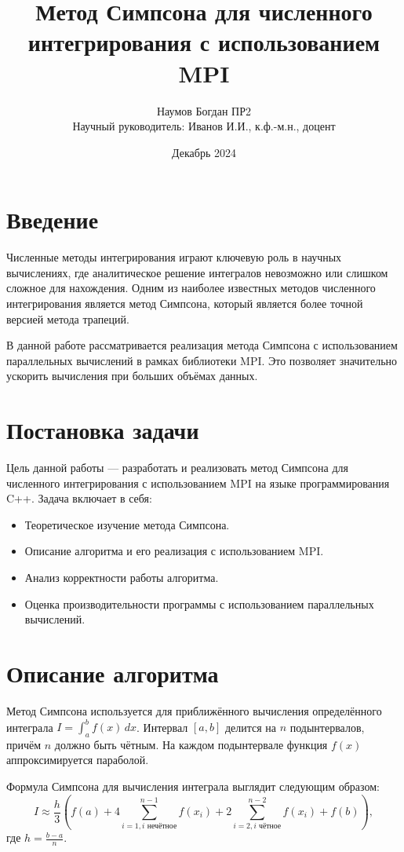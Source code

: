 \documentclass[a4paper,12pt]{article}
\title{Метод Симпсона для численного интегрирования с использованием MPI}
\author{Наумов Богдан ПР2\\Научный руководитель: Иванов И.И., к.ф.-м.н., доцент}
\date{Декабрь 2024}
\begin{document}
\maketitle

\section{Введение}
Численные методы интегрирования играют ключевую роль в научных вычислениях, где аналитическое решение интегралов невозможно или слишком сложное для нахождения. Одним из наиболее известных методов численного интегрирования является метод Симпсона, который является более точной версией метода трапеций.

В данной работе рассматривается реализация метода Симпсона с использованием параллельных вычислений в рамках библиотеки MPI. Это позволяет значительно ускорить вычисления при больших объёмах данных.

\section{Постановка задачи}
Цель данной работы — разработать и реализовать метод Симпсона для численного интегрирования с использованием MPI на языке программирования C++. Задача включает в себя:
\begin{itemize}
    \item Теоретическое изучение метода Симпсона.
    \item Описание алгоритма и его реализация с использованием MPI.
    \item Анализ корректности работы алгоритма.
    \item Оценка производительности программы с использованием параллельных вычислений.
\end{itemize}

\section{Описание алгоритма}
Метод Симпсона используется для приближённого вычисления определённого интеграла \( I = \int_a^b f(x) \, dx \). Интервал \([a, b]\) делится на \(n\) подынтервалов, причём \(n\) должно быть чётным. На каждом подынтервале функция \(f(x)\) аппроксимируется параболой.

Формула Симпсона для вычисления интеграла выглядит следующим образом:
\[
I \approx \frac{h}{3} \left( f(a) + 4 \sum_{i=1, i \text{ нечётное}}^{n-1} f(x_i) + 2 \sum_{i=2, i \text{ чётное}}^{n-2} f(x_i) + f(b) \right),
\]
где \(h = \frac{b-a}{n}\).
\end{document}
